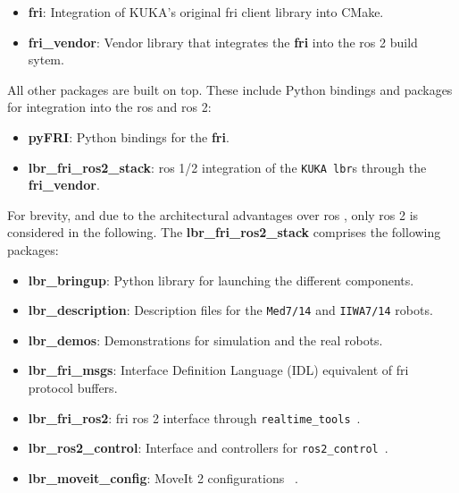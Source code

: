 \begin{itemize}
\item
  \textbf{fri}: Integration of KUKA's original \gls{fri} client library into
  CMake.
\item
  \textbf{fri\_vendor}: Vendor library that integrates the \textbf{fri}
  into the \gls{ros} 2 build sytem.
\end{itemize}

All other packages are built on top. These include Python bindings and
packages for integration into the \gls{ros} and \gls{ros}
2:

\begin{itemize}
\item
  \textbf{pyFRI}: Python bindings for the \textbf{fri}.
\item
  \textbf{lbr\_fri\_ros2\_stack}: \gls{ros} 1/2 integration of the
  \texttt{KUKA\ \gls{lbr}}s through the \textbf{fri\_vendor}.
\end{itemize}

For brevity, and due to the architectural advantages over \gls{ros}
\cite{ref-ros2}, only \gls{ros} 2 is
considered in the following. The \textbf{lbr\_fri\_ros2\_stack}
comprises the following packages:

\begin{itemize}
\item
  \textbf{lbr\_bringup}: Python library for launching the different
  components.
\item
  \textbf{lbr\_description}: Description files for the \texttt{Med7/14}
  and \texttt{IIWA7/14} robots.
\item
  \textbf{lbr\_demos}: Demonstrations for simulation and the real
  robots.
\item
  \textbf{lbr\_fri\_msgs}: Interface Definition Language (IDL)
  equivalent of \gls{fri} protocol buffers.
\item
  \textbf{lbr\_fri\_ros2}: \gls{fri} \gls{ros} 2 interface through
  \texttt{realtime\_tools}~\cite{ref-ros_control}.
\item
  \textbf{lbr\_ros2\_control}: Interface and controllers for
  \texttt{ros2\_control}~\cite{ref-ros2_control}.
\item
  \textbf{lbr\_moveit\_config}: MoveIt 2 configurations
 ~\cite{ref-moveit}.
\end{itemize}

